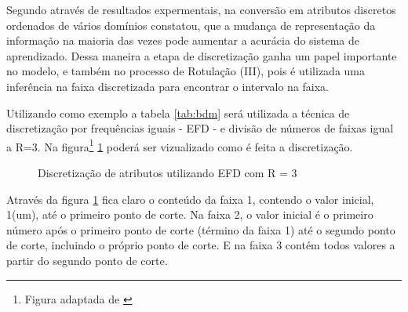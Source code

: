 Segundo  através de resultados expermentais, na conversão em atributos discretos ordenados de vários domínios constatou, que a mudança de representação da informação na maioria das vezes  pode aumentar a acurácia do sistema de aprendizado. Dessa maneira a etapa de discretização ganha um papel importante no modelo, e também no processo de Rotulação (III), pois é utilizada uma inferência na faixa discretizada para encontrar o intervalo na faixa.

Utilizando como exemplo a tabela \ref{tab:bdm} será utilizada a técnica de discretização por frequências iguais - EFD - e divisão de números de faixas igual a R=3. Na figura\footnote{Figura adaptada de \cite{LOPES2014}} \ref{fig:EFD_R_3} poderá ser vizualizado como é feita a discretização.

 \begin{figure}[!h]
    \centering
    
    
    
    \caption{Discretização de atributos utilizando EFD com R = 3} \label{fig:EFD_R_3}
        
\end{figure}

Através da figura \ref{fig:EFD_R_3} fica claro o conteúdo da faixa 1, contendo o valor inicial, 1(um), até o primeiro ponto de corte. Na faixa 2, o valor inicial é o primeiro número após o primeiro ponto de corte (término da faixa 1) até o segundo ponto de corte, incluindo o próprio ponto de corte. E na faixa 3 contém todos  valores a partir do segundo ponto de corte.

